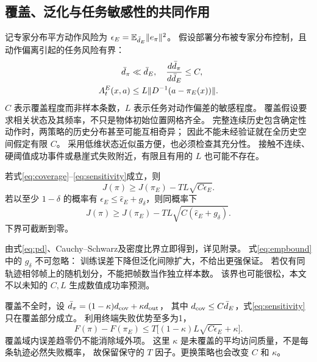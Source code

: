 \subsection{覆盖、泛化与任务敏感性的共同作用}
记专家分布平方动作风险为
$\epsilon_E=\mathbb E_{\bar d_E}\lVert e_\pi\rVert^2$。
假设部署分布被专家分布控制，且动作偏离引起的任务风险有界：
\begin{align}
 \bar d_\pi&\ll\bar d_E,\quad
 \frac{d\bar d_\pi}{d\bar d_E}\le C, \label{eq:coverage}\\
 A_t^E(x,a)&\le L\lVert D^{-1}(a-\pi_E(x))\rVert. \label{eq:sensitivity}
\end{align}
$C$ 表示覆盖程度而非样本条数，$L$ 表示任务对动作偏差的敏感程度。
覆盖假设要求相关状态及其频率，不只是物体初始位置网格齐全。
完整连续历史包含确定性动作时，两策略的历史分布甚至可能互相奇异；
因此不能未经验证就在全历史空间假定有限 $C$。
采用低维状态近似虽方便，也必须检查其充分性。
接触不连续、硬阈值成功事件或悬崖式失败附近，有限且有用的 $L$ 也可能不存在。

\begin{proposition}[动作风险到成功率的条件性界]
若式\eqref{eq:coverage}--\eqref{eq:sensitivity}成立，则
\begin{equation}
 J(\pi)\ge J(\pi_E)-TL\sqrt{C\epsilon_E}.
 \label{eq:successbound}
\end{equation}
若以至少 $1-\delta$ 的概率有
$\epsilon_E\le\widehat\epsilon_E+g_\delta$，则同概率下
\begin{equation}
 J(\pi)\ge J(\pi_E)-TL\sqrt{C(\widehat\epsilon_E+g_\delta)}.
 \label{eq:empbound}
\end{equation}
下界可截断到零。
\end{proposition}
由式\eqref{eq:pd}、Cauchy--Schwarz及密度比界立即得到，详见附录。
式\eqref{eq:empbound}中的 $g_\delta$ 不可忽略：
训练误差下降但泛化间隙扩大，不给出更强保证。
若仅有同轨迹相邻帧上的随机划分，不能把帧数当作独立样本数。
该界也可能很松，本文不以未知的 $C,L$ 生成数值成功率预测。

覆盖不全时，设
$\bar d_\pi=(1-\kappa)d_{\rm cov}+\kappa d_{\rm out}$，
其中 $d_{\rm cov}\le C\bar d_E$，式\eqref{eq:sensitivity}只在覆盖部分成立。
利用终端失败优势至多为1，
\begin{equation}
 F(\pi)-F(\pi_E)
 \le T\big[(1-\kappa)L\sqrt{C\epsilon_E}+\kappa\big].
 \label{eq:uncovered}
\end{equation}
覆盖域内误差趋零仍不能消除域外项。
这里 $\kappa$ 是未覆盖的平均访问质量，不是每条轨迹必然失败概率，
故保留保守的 $T$ 因子。更换策略也会改变 $C$ 和 $\kappa$。

